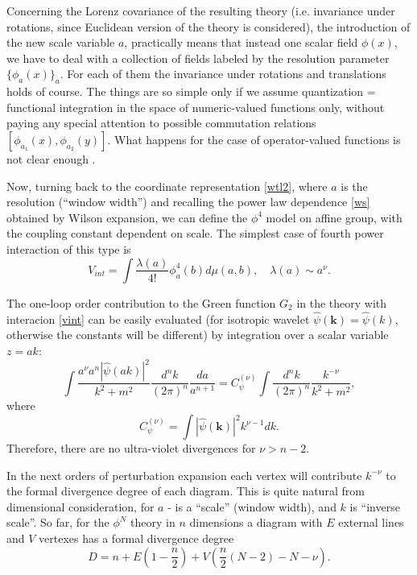 \documentclass[a4paper,a4paper]{article}
\def\bvec#1{\mathbf{#1}}
\def\dk#1#2{\frac{ d^{#2}{#1} }{ (2\pi)^{#2} }} %
\def\da#1#2{\frac{ d{#1}}{{#1}^{{#2}+1}}}
\begin{document}
Concerning the Lorenz covariance of the resulting theory (i.e. invariance 
under rotations, since Euclidean version of the theory is considered), the  
introduction of the new scale variable $a$, practically means that instead 
one scalar field $\phi(x)$, we have to deal with a collection of fields 
labeled by the resolution parameter $\{ \phi_a(x) \}_a$. For each of them 
the invariance under rotations and translations holds of course. The things 
are so simple only if we assume quantization = functional integration 
in the space of numeric-valued functions only, without paying any special 
attention to possible commutation relations $[\phi_{a_1}(x),\phi_{a_2}(y)]$.
What happens for the case of operator-valued functions is not clear enough 
\cite{Federbush}.   

Now, turning back to the coordinate representation \eqref{wtl2}, where 
$a$ is the resolution (``window width'') and recalling the power law 
dependence \eqref{ws} obtained by Wilson expansion, we can define the 
$\phi^4$ model on affine group, with the coupling constant 
dependent on scale. The simplest case of fourth power interaction 
of this type is
\begin{equation} 
V_{int} =\int \frac{\lambda(a)}{4!} \phi^4_a(b) d\mu(a,b),
\quad  \lambda(a)\sim a^\nu.
\label{vint}
\end{equation}

The one-loop order contribution to the Green function $G_2$ 
in the theory with interacion \eqref{vint}
can be easily evaluated 
(for isotropic wavelet $\hat\psi(\mathbf{k})=\hat\psi(k)$, otherwise 
the constants will be different) by integration over a scalar variable 
$z = ak$: 
\begin{equation}
\int \frac{a^\nu a^n |\hat\psi(ak)|^2 }{k^2+m^2}\dk{k}{n}\da{a}{n}  
= C_\psi^{(\nu)}  \int \dk{k}{n} \frac{k^{-\nu}}{k^2+m^2}, 
\end{equation} 
where $$C_\psi^{(\nu)}=\int |\hat\psi(\bvec{k})|^2 k^{\nu-1}dk.$$ 
Therefore, there are no ultra-violet divergences for $\nu>n-2$. 

In the next orders of perturbation expansion each vertex will contribute 
$k^{-\nu}$ to the formal divergence degree of each diagram. This is quite 
natural from dimensional consideration, for $a$ - is a ``scale'' (window 
width), and $k$ is ``inverse scale''.  
So far, for the $\phi^N$ theory 
in $n$ dimensions a diagram with $E$ external lines and $V$ vertexes 
has a formal divergence degree 
\begin{equation}
D = n + E\left({1-\frac{n}{2}}\right) 
+ V\left({\frac{n}{2}(N-2)-N-\nu}\right). 
\label{dd}
\end{equation} 
\end{document}
